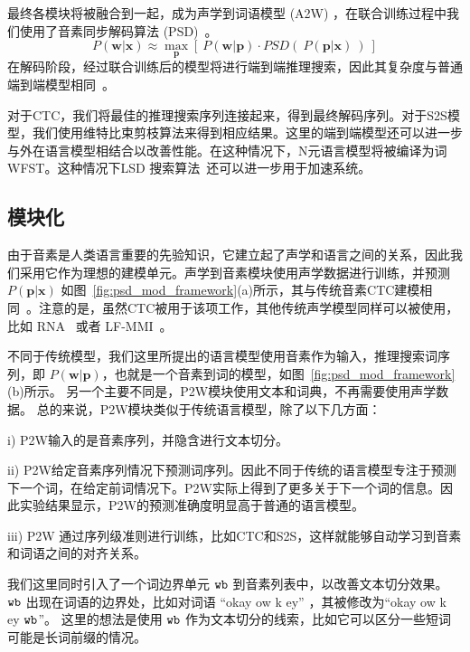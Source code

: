 最终各模块将被融合到一起，成为声学到词语模型 (A2W) ，在联合训练过程中我们使用了音素同步解码算法 (PSD)~\cite{zhc00-chen-tasl2017}。
\begin{equation}
\label{equ:framework-2}
P(\mathbf{w}|\mathbf{x})\approx \max_{\mathbf{p}}\left[\ P(\mathbf{w}|\mathbf{p}) \cdot PSD(\ P(\mathbf{p}|\mathbf{x})\ )\ \right]
\end{equation}
在解码阶段，经过联合训练后的模型将进行端到端推理搜索，因此其复杂度与普通端到端模型相同~\cite{audhkhasi2017direct}。

对于CTC，我们将最佳的推理搜索序列连接起来，得到最终解码序列。对于S2S模型，我们使用维特比束剪枝算法来得到相应结果。这里的端到端模型还可以进一步与外在语言模型相结合以改善性能。在这种情况下，N元语言模型将被编译为词WFST。这种情况下LSD 搜索算法~\cite{zhc00-chen-tasl2017}还可以进一步用于加速系统。


\subsection{模块化}
\label{sec:psd_mod_modu}
由于音素是人类语言重要的先验知识，它建立起了声学和语言之间的关系，因此我们采用它作为理想的建模单元。声学到音素模块使用声学数据进行训练，并预测 $P(\mathbf{p}|\mathbf{x})$ 如图~\ref{fig:psd_mod_framework}(a)所示，其与传统音素CTC建模相同~\cite{miao2015eesen}。注意的是，虽然CTC被用于该项工作，其他传统声学模型同样可以被使用，比如 RNA~\cite{sak2017recurrent} 或者 LF-MMI~\cite{povey2016purely}。

不同于传统模型，我们这里所提出的语言模型使用音素作为输入，推理搜索词序列，即 $P(\mathbf{w}|\mathbf{p})$，也就是一个音素到词的模型，如图~\ref{fig:psd_mod_framework}(b)所示。
另一个主要不同是，P2W模块使用文本和词典，不再需要使用声学数据。
总的来说，P2W模块类似于传统语言模型，除了以下几方面：

i) P2W输入的是音素序列，并隐含进行文本切分。

ii) P2W给定音素序列情况下预测词序列。因此不同于传统的语言模型专注于预测下一个词，在给定前词情况下。P2W实际上得到了更多关于下一个词的信息。因此实验结果显示，P2W的预测准确度明显高于普通的语言模型。

iii) P2W 通过序列级准则进行训练，比如CTC和S2S，这样就能够自动学习到音素和词语之间的对齐关系。


我们这里同时引入了一个词边界单元 $\tt wb$ 到音素列表中，以改善文本切分效果。 $\tt wb$ 出现在词语的边界处，比如对词语 ``okay ow k ey'' ，其被修改为``okay ow k ey $\tt wb$''。 这里的想法是使用 $\tt wb$ 作为文本切分的线索，比如它可以区分一些短词可能是长词前缀的情况。

